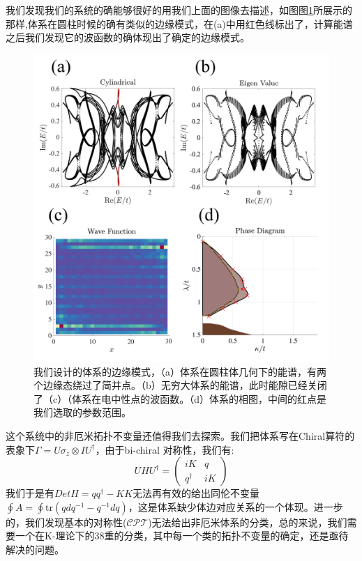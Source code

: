 \documentclass[supercite]{HustGraduPaper}
\begin{document}
我们发现我们的系统的确能够很好的用我们上面的图像去描述，如图图\ref{fig:sp32}所展示的那样,体系在圆柱时候的确有类似的边缘模式，在(a)中用红色线标出了，计算能谱之后我们发现它的波函数的确体现出了确定的边缘模式。
\begin{figure}
	\centering
	\includegraphics[width=1\linewidth]{Figures/topoinsu/SP3_2}
	\caption{我们设计的体系的边缘模式，（a）体系在圆柱体几何下的能谱，有两个边缘态绕过了简并点。（b）无穷大体系的能谱，此时能隙已经关闭了（c）（体系在电中性点的波函数。（d）体系的相图，中间的红点是我们选取的参数范围。}
	\label{fig:sp32}
\end{figure}

这个系统中的非厄米拓扑不变量还值得我们去探索\cite{Gong2018topo}。我们把体系写在Chiral算符的表象下$\Gamma = U \sigma_z \otimes I U^\dagger$，由于bi-chiral 对称性，我们有:
\begin{equation}
U H U^{\dagger} =\left( \begin{array}{cc}
iK & q \\ 
q^{\dagger} & iK
\end{array} \right)
\end{equation}
我们于是有$Det H = q q^\dagger - KK$无法再有效的给出同伦不变量$\oint A =\oint \text{tr}(qdq^{-1} - q^{-1}dq)$，这是体系缺少体边对应关系的一个体现\cite{Osterloh2005,leykam2017edge}。进一步的，我们发现基本的对称性($\mathcal{CPT}$)无法给出非厄米体系的分类，总的来说，我们需要一个在K-理论下的38重的分类，其中每一个类的拓扑不变量的确定，还是亟待解决的问题\cite{kawabata2018symmetry,Gong2018topo}。
\end{document}
